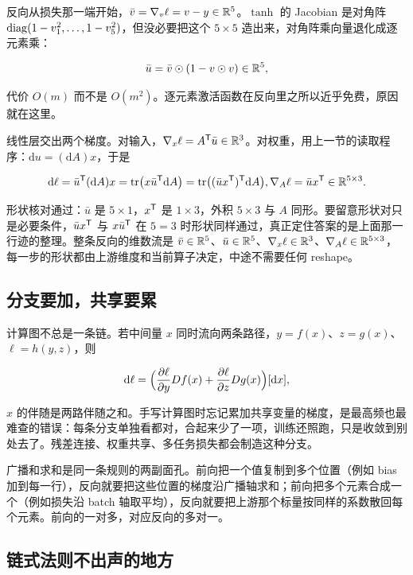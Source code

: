 反向从损失那一端开始，\(\bar v=\nabla_v\ell=v-y\in\mathbb{R}^5\)。\(\tanh\) 的 Jacobian 是对角阵 \(\operatorname{diag}(1-v_1^2,\dots,1-v_5^2)\)，但没必要把这个 \(5\times 5\) 造出来，对角阵乘向量退化成逐元素乘：

\[
\bar u=\bar v\odot(1-v\odot v)\in\mathbb{R}^5,
\]

代价 \(O(m)\) 而不是 \(O(m^2)\)。逐元素激活函数在反向里之所以近乎免费，原因就在这里。

线性层交出两个梯度。对输入，\(\nabla_x\ell=A^{\mathsf{T}}\bar u\in\mathbb{R}^3\)。对权重，用上一节的读取程序：\(\mathrm du=(\mathrm dA)x\)，于是

\[
\mathrm d\ell=\bar u^{\mathsf{T}}(\mathrm dA)x=\operatorname{tr}\bigl(x\bar u^{\mathsf{T}}\mathrm dA\bigr)
=\operatorname{tr}\bigl((\bar ux^{\mathsf{T}})^{\mathsf{T}}\mathrm dA\bigr),
\space
\nabla_A\ell=\bar ux^{\mathsf{T}}\in\mathbb{R}^{5\times 3}.
\]

形状核对通过：\(\bar u\) 是 \(5\times 1\)，\(x^{\mathsf{T}}\) 是 \(1\times 3\)，外积 \(5\times 3\) 与 \(A\) 同形。要留意形状对只是必要条件，\(\bar ux^{\mathsf{T}}\) 与 \(x\bar u^{\mathsf{T}}\) 在 \(5=3\) 时形状同样通过，真正定住答案的是上面那一行迹的整理。整条反向的维数流是 \(\bar v\in\mathbb{R}^5\)、\(\bar u\in\mathbb{R}^5\)、\(\nabla_x\ell\in\mathbb{R}^3\)、\(\nabla_A\ell\in\mathbb{R}^{5\times 3}\)，每一步的形状都由上游维度和当前算子决定，中途不需要任何 reshape。

\subsection{分支要加，共享要累}

计算图不总是一条链。若中间量 \(x\) 同时流向两条路径，\(y=f(x)\)、\(z=g(x)\)、\(\ell=h(y,z)\)，则

\[
\mathrm d\ell=\Bigl(\frac{\partial\ell}{\partial y}Df(x)+\frac{\partial\ell}{\partial z}Dg(x)\Bigr)[\mathrm dx],
\]

\(x\) 的伴随是两路伴随之和。手写计算图时忘记累加共享变量的梯度，是最高频也最难查的错误：每条分支单独看都对，合起来少了一项，训练还照跑，只是收敛到别处去了。残差连接、权重共享、多任务损失都会制造这种分支。

广播和求和是同一条规则的两副面孔。前向把一个值复制到多个位置（例如 bias 加到每一行），反向就要把这些位置的梯度沿广播轴求和；前向把多个元素合成一个（例如损失沿 batch 轴取平均），反向就要把上游那个标量按同样的系数散回每个元素。前向的一对多，对应反向的多对一。

\subsection{链式法则不出声的地方}

